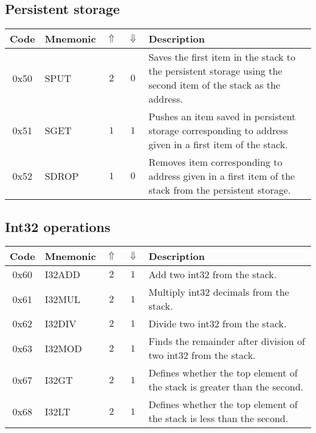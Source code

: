 \documentclass[12pt,a4paper]{article}
\begin{document}
\subsection{Persistent storage}
\begin{tabularx}{\textwidth}{ c l c c p{7cm} }
\textbf{Code} & \textbf{Mnemonic} & \textbf{$\Uparrow$} & \textbf{$\Downarrow$} & \textbf{Description} \\
\hline
0x50 & SPUT & $2$ & $0$ & Saves the first item in the stack to the persistent storage using the second item of the stack as the address.  \\
\hline
0x51 & SGET & $1$ & $1$ & Pushes an item saved in persistent storage corresponding to address given in a first item of the stack.  \\
\hline
0x52 & SDROP & $1$ & $0$ & Removes item corresponding to address given in a first item of the stack from the persistent storage.  \\
\hline
\end{tabularx}

\subsection{Int32 operations}
\begin{tabularx}{\textwidth}{ c l c c p{7cm} }
\textbf{Code} & \textbf{Mnemonic} & \textbf{$\Uparrow$} & \textbf{$\Downarrow$} & \textbf{Description} \\
\hline
0x60 & I32ADD & $2$ & $1$ & Add two int32 from the stack. \\
\hline
0x61 & I32MUL & $2$ & $1$ & Multiply int32 decimals from the stack. \\
\hline
0x62 & I32DIV & $2$ & $1$ & Divide two int32 from the stack. \\
\hline
0x63 & I32MOD & $2$ & $1$ & Finds the remainder after division of two int32 from the stack. \\
\hline
0x67 & I32GT & $2$ & $1$ & Defines whether the top element of the stack is greater than the second. \\
\hline
0x68 & I32LT & $2$ & $1$ & Defines whether the top element of the stack is less than the second. \\
\hline

\end{tabularx}
\end{document}
